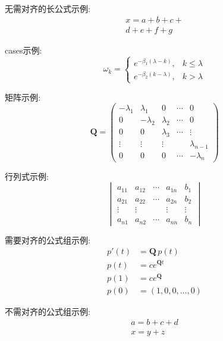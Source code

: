 \documentclass{cosbook}
\begin{document}
无需对齐的长公式示例:
\begin{multline*}
x=a+b+c+\\
d+e+f+g
\end{multline*}

cases示例:
\[ \omega_k=\begin{cases}
e^{-\beta_1(\lambda-k)}, & k \leq \lambda\\
e^{-\beta_2(k-\lambda)}, & k > \lambda
\end{cases} \]

矩阵示例:
\[
\mathbf{Q}=\begin{pmatrix}
-\lambda_1 & \lambda_1 & 0 & \cdots & 0 \\
0 & -\lambda_2 & \lambda_2 & \cdots & 0 \\
0 & 0 & \lambda_3 & \cdots & \vdots \\
\vdots & \vdots & \vdots &  & \lambda_{n-1} \\
0 & 0 & 0 & \cdots & -\lambda_{n}
\end{pmatrix}
\]

行列式示例:
\[
\begin{vmatrix}
a_{11} & a_{12} & \cdots & a_{1n} & b_{1}\\
a_{21} & a_{22} & \cdots & a_{2n} & b_{2}\\
\vdots & \vdots &  & \vdots & \vdots\\
a_{n1} & a_{n2} & \cdots & a_{nn} & b_{n}
\end{vmatrix}
\]

需要对齐的公式组示例:
\begin{align*}
p'(t)&=\mathbf{Q}\,p(t)\\
p(t) &=c e^{\mathbf{Q}t}\\
p(1) &=c e^{\mathbf{Q}}\\
p(0) &=(1, 0, 0, \ldots, 0)
\end{align*}

不需对齐的公式组示例:
\begin{gather*}
a=b+c+d\\
x=y+z
\end{gather*}
\end{document}
